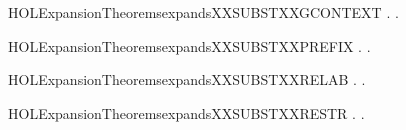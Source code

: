 \newcommand{\HOLExpansionTheoremsexpandsXXrules}{\UseVerbatim{HOLExpansionTheoremsexpandsXXrules}}
\begin{SaveVerbatim}{HOLExpansionTheoremsexpandsXXSUBSTXXGCONTEXT}
\HOLTokenTurnstile{} \HOLSymConst{\HOLTokenForall{}} .    \HOLSymConst{\HOLTokenImp{}} \HOLSymConst{\HOLTokenForall{}}.   \HOLSymConst{\HOLTokenImp{}}     
\end{SaveVerbatim}
\newcommand{\HOLExpansionTheoremsexpandsXXSUBSTXXGCONTEXT}{\UseVerbatim{HOLExpansionTheoremsexpandsXXSUBSTXXGCONTEXT}}
\begin{SaveVerbatim}{HOLExpansionTheoremsexpandsXXSUBSTXXPREFIX}
\HOLTokenTurnstile{} \HOLSymConst{\HOLTokenForall{}} .    \HOLSymConst{\HOLTokenImp{}} \HOLSymConst{\HOLTokenForall{}}. \HOLSymConst{\ensuremath{\ldotp}}  \HOLSymConst{\ensuremath{\ldotp}}
\end{SaveVerbatim}
\newcommand{\HOLExpansionTheoremsexpandsXXSUBSTXXPREFIX}{\UseVerbatim{HOLExpansionTheoremsexpandsXXSUBSTXXPREFIX}}
\begin{SaveVerbatim}{HOLExpansionTheoremsexpandsXXSUBSTXXRELAB}
\HOLTokenTurnstile{} \HOLSymConst{\HOLTokenForall{}} .    \HOLSymConst{\HOLTokenImp{}} \HOLSymConst{\HOLTokenForall{}}.       
\end{SaveVerbatim}
\newcommand{\HOLExpansionTheoremsexpandsXXSUBSTXXRELAB}{\UseVerbatim{HOLExpansionTheoremsexpandsXXSUBSTXXRELAB}}
\begin{SaveVerbatim}{HOLExpansionTheoremsexpandsXXSUBSTXXRESTR}
\HOLTokenTurnstile{} \HOLSymConst{\HOLTokenForall{}} .    \HOLSymConst{\HOLTokenImp{}} \HOLSymConst{\HOLTokenForall{}}.       
\end{SaveVerbatim}
\newcommand{\HOLExpansionTheoremsexpandsXXSUBSTXXRESTR}{\UseVerbatim{HOLExpansionTheoremsexpandsXXSUBSTXXRESTR}}
